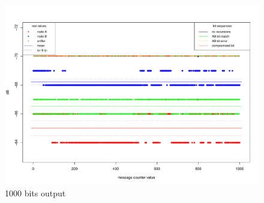 \documentclass[
  print, %
  table,   %
  nolof,     %
  nolot,     %
           oneside
]{fithesis3}
\begin{document}
\begin{figure}
  \includegraphics[height=\textwidth, angle = 90 ]{../images/graph_rssi_03.pdf}
\caption{1000 bits output}
\label{fig:rssi_03}
\end{figure}
\end{document}
